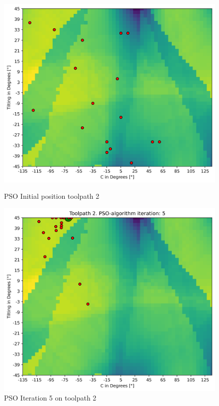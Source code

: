 \begin{figure}[H]	
	\centering
	\begin{minipage}{0.5\textwidth}
		\includegraphics[width=\textwidth]{figures/swarm_true/2_0.png}
		\caption{PSO Initial position toolpath 2}
		\label{tp2_0}
	\end{minipage}\hfill
	\begin{minipage}{0.5\textwidth}
		\includegraphics[width=\textwidth]{figures/swarm_true/2_5.png}
		\caption{PSO Iteration 5 on toolpath 2}
		\label{tp2_5}
	\end{minipage}\par
\end{figure}

